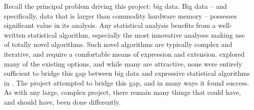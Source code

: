 Recall the principal problem driving this project: big data.
Big data -- and specifically, data that is larger than commodity hardware memory -- possesses significant value in its analysis.
Any statistical analysis benefits from a well-written statistical algorithm, especially the most innovative analyses making use of totally novel algorithms.
Such novel algorithms are typically complex and iterative, and require a comfortable means of expression and extension.
 explored many of the existing options, and while many are attractive, none were entirely sufficient to bridge this gap between big data and expressive statistical algorithms in \R{}.
The \lsr{} project attempted to bridge this gap, and in many ways it found success.
As with any large, complex project, there remain many things that could have, and should have, been done differently.



